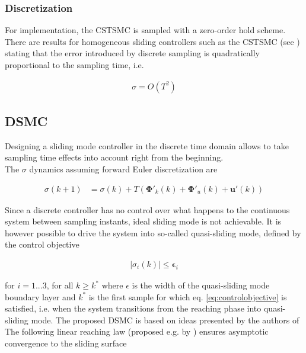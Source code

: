 \documentclass{ifacconf}
\providecommand{\mbf}[1]{\mathbf{#1}}
\begin{document}
\subsubsection{Discretization}
For implementation, the CSTSMC is sampled with a zero-order hold scheme. There are results for homogeneous sliding controllers such as the CSTSMC (see \cite{shtessel2014sliding}) stating that the error introduced by discrete sampling is quadratically proportional to the sampling time, i.e.

\begin{align}
\sigma = O(T^2)
\end{align}


\subsection{DSMC}
Designing a sliding mode controller in the discrete time domain allows to take sampling time effects into account right from the beginning. \\
The $\sigma$ dynamics assuming forward Euler discretization are

\begin{align}
{{\sigma}}(k+1)
&=
{{\sigma}}(k)
+
T(
\mbf{\Phi}'_k(k) + \mbf{\Phi}'_u(k) + \mbf{u}'(k))
\label{eq:sigmadyndiscrete}
\end{align}

Since a discrete controller has no control over what happens to the continuous system between sampling instants, ideal sliding mode is not achievable. It is however possible to drive the system into so-called quasi-sliding mode, defined by the control objective

\begin{align}
|{\sigma}_i(k)| \leq \mbf{\epsilon}_i
\label{eq:controlobjective}
\end{align}

for $i=1...3$, for all $k \geq k^*$ where $\epsilon$ is the width of the quasi-sliding mode boundary layer and $k^*$ is the first sample for which eq. \ref{eq:controlobjective} is satisfied, i.e. when the system transitions from the reaching phase into quasi-sliding mode.
The proposed DSMC is based on ideas presented by the authors of \cite{monsees2001discrete}
The following linear reaching law (proposed e.g. by \cite{Spurgeon1992}) ensures asymptotic convergence to the sliding surface
\end{document}
